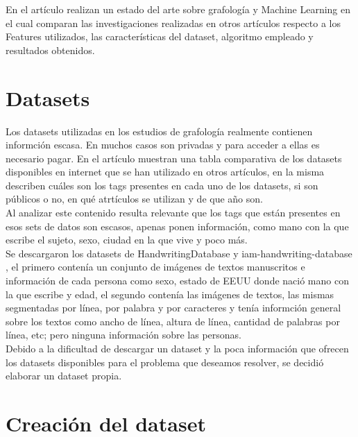\documentclass[10pt, a4paper]{article}
\begin{document}
        En el art\'iculo \cite{remaida2020handwriting} realizan un estado del arte sobre grafolog\'ia y Machine Learning en el cual comparan las investigaciones realizadas en 
        otros art\'iculos respecto a los Features utilizados, las caracter\'isticas del dataset, algoritmo empleado y resultados obtenidos.

    \section{Datasets}

        Los datasets utilizadas en los estudios de grafolog\'ia realmente contienen informci\'on escasa. En muchos casos 
        son privadas y para acceder a ellas es necesario pagar. En el art\'iculo \cite{likforman2017emothaw} muestran una tabla comparativa de los datasets disponibles en 
        internet que se han utilizado en otros art\'iculos, en la misma describen cu\'ales son los tags presentes en cada uno de los datasets, si son p\'ublicos o no, en qu\'e atrt\'iculos se utilizan y 
        de que a\~no son. \\ 

        Al analizar este contenido resulta relevante que los tags que est\'an presentes en esos sets de datos son escasos, apenas ponen informaci\'on, como mano con la que escribe el sujeto, sexo, 
        ciudad en la que vive y poco m\'as. \\ 

        Se descargaron los datasets de HandwritingDatabase \cite{DataSet1} y iam-handwriting-database \cite{DataSet2}, el primero conten\'ia un conjunto de im\'agenes de textos manuscritos e informaci\'on de cada persona como sexo, estado de EEUU donde naci\'o 
        mano con la que escribe y edad, el segundo conten\'ia las im\'agenes de textos, las mismas segmentadas por l\'inea, por palabra y por caracteres y ten\'ia informci\'on general sobre los textos como 
        ancho de l\'inea, altura de l\'inea, cantidad de palabras por l\'inea, etc; pero ninguna informaci\'on sobre las personas. \\ 

        Debido a la dificultad de descargar un dataset y la poca informaci\'on que ofrecen los datasets disponibles para el problema que deseamos resolver, se decidi\'o elaborar un dataset propia.

    \section{Creaci\'on del dataset}
\end{document}
